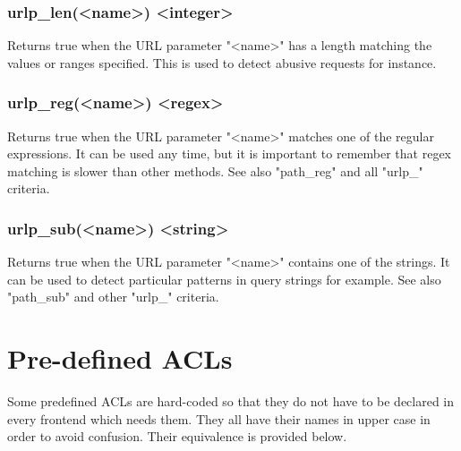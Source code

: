 \subsubsection[urlp\_len]{urlp\_len(<name>) <integer>}
  Returns true when the URL parameter "<name>" has a length matching the values
  or ranges specified. This is used to detect abusive requests for instance.

\subsubsection[urlp\_reg]{urlp\_reg(<name>) <regex>}
  Returns true when the URL parameter "<name>" matches one of the regular
  expressions. It can be used any time, but it is important to remember that
  regex matching is slower than other methods. See also "path\_reg" and all
  "urlp\_" criteria.

\subsubsection[urlp\_sub]{urlp\_sub(<name>) <string>}
  Returns true when the URL parameter "<name>" contains one of the strings. It
  can be used to detect particular patterns in query strings for example. See
  also "path\_sub" and other "urlp\_" criteria.

\section{Pre-defined ACLs}

Some predefined ACLs are hard-coded so that they do not have to be declared in
every frontend which needs them. They all have their names in upper case in
order to avoid confusion. Their equivalence is provided below.

